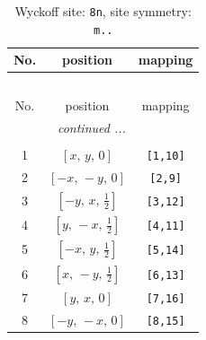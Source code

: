 \documentclass[fleqn,8pt]{jsarticle}
\begin{document}
\begin{longtable}{ccc}
\caption{Wyckoff site: {\tt 8n}, site symmetry: {\tt m..}}
 \\
 \hline \hline
No. & position & mapping \\ \hline \endfirsthead

\multicolumn{2}{l}{\tablename\ \thetable{}} \\
 \hline \hline
No. & position & mapping \\ \hline \endhead

 \hline \hline
\multicolumn{2}{r}{\footnotesize\it continued ...} \\ \endfoot

 \hline \hline
\multicolumn{2}{r}{} \\ \endlastfoot

1 & $\left[ x,\, y,\, 0 \right]$ & {\tt [1,10]} \\ \hline
2 & $\left[ - x,\, - y,\, 0 \right]$ & {\tt [2,9]} \\ \hline
3 & $\left[ - y,\, x,\, \frac{1}{2} \right]$ & {\tt [3,12]} \\ \hline
4 & $\left[ y,\, - x,\, \frac{1}{2} \right]$ & {\tt [4,11]} \\ \hline
5 & $\left[ - x,\, y,\, \frac{1}{2} \right]$ & {\tt [5,14]} \\ \hline
6 & $\left[ x,\, - y,\, \frac{1}{2} \right]$ & {\tt [6,13]} \\ \hline
7 & $\left[ y,\, x,\, 0 \right]$ & {\tt [7,16]} \\ \hline
8 & $\left[ - y,\, - x,\, 0 \right]$ & {\tt [8,15]} \\
\end{longtable}
\renewcommand{\arraystretch}{1.2}
\end{document}
